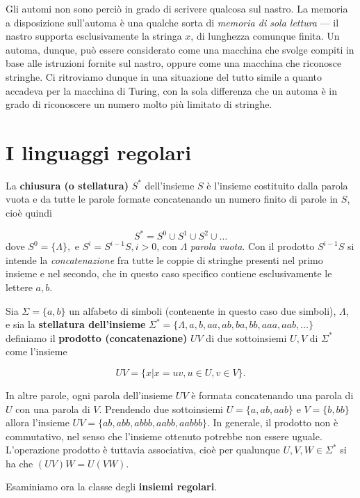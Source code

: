 \documentclass[10pt]{\classname}
\theoremstyle{newlinethm}
\theoremstyle{theorem}
\theoremstyle{definition}
\theoremstyle{definition}
\theoremstyle{definition}
\theoremstyle{definition}
\begin{document}
Gli automi non sono perciò in grado di scrivere qualcosa sul nastro. La memoria
a disposizione sull'automa è una qualche sorta di \emph{memoria di sola
lettura} --- il nastro supporta esclusivamente la stringa $x$, di lunghezza
comunque finita. Un automa, dunque, può essere considerato come una macchina
che svolge compiti in base alle istruzioni fornite sul nastro, oppure come una
macchina che riconosce stringhe. Ci ritroviamo dunque in una situazione del
tutto simile a quanto accadeva per la macchina di Turing, con la sola
differenza che un automa è in grado di riconoscere un numero molto più limitato
di stringhe.

\section{I linguaggi regolari}

La \textbf{chiusura (o stellatura)} $S^*$ dell'insieme $S$ è l'insieme
costituito dalla parola vuota e da tutte le parole formate concatenando un
numero finito di parole in $S$, cioè quindi

$$S^* = S^0 \cup S^1 \cup S^2 \cup \dots$$
dove $S^0 = \{\Lambda\},$ e $S^i=S^{i-1}S, i > 0$, con $\Lambda$ \emph{parola
vuota}. Con il prodotto $S^{i-1}S$ si intende la \emph{concatenazione} fra
tutte le coppie di stringhe presenti nel primo insieme e nel secondo, che in
questo caso specifico contiene esclusivamente le lettere $a, b$.

Sia $\Sigma = \{a, b\}$ un alfabeto di simboli (contenente in questo caso due
simboli), $\Lambda$, e sia la \textbf{stellatura
dell'insieme} $\Sigma^* = \{\Lambda, a, b, aa, ab, ba, bb, aaa, aab, \dots\}$
definiamo il \textbf{prodotto (concatenazione)} $UV$ di due sottoinsiemi $U, V$
di $\Sigma^*$ come l'insieme

$$UV = \{x | x= uv, u \in U, v \in V\}.$$

In altre parole, ogni parola dell'insieme $UV$ è formata concatenando una
parola di $U$ con una parola di $V$. Prendendo due sottoinsiemi $U=\{a, ab,
aab\}$ e $V=\{b, bb\}$ allora l'insieme $UV = \{ab, abb, abbb, aabb, aabbb\}$.
In generale, il prodotto non è commutativo, nel senso che l'insieme ottenuto
potrebbe non essere uguale. L'operazione prodotto è tuttavia associativa, cioè
per qualunque $U, V, W \in \Sigma^*$ si ha che $(UV)W = U(VW)$.

Esaminiamo ora la classe degli \textbf{insiemi regolari}. 
\end{document}
